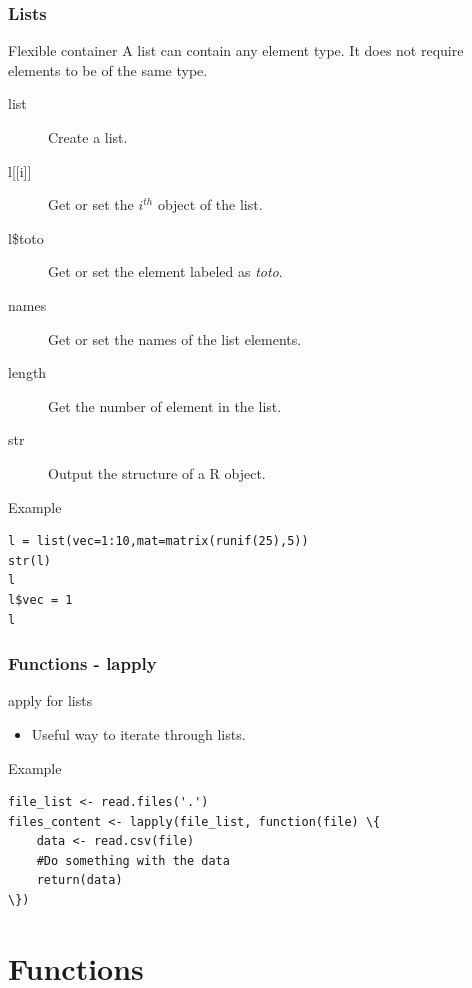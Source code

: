 \documentclass[10pt]{beamer}
\newenvironment{xframe}[2][]
  {\begin{frame}[fragile,environment=xframe,#1]
  \frametitle{#2}}
  {\end{frame}}
\begin{document}
\begin{xframe}{Lists}
  \begin{block}{Flexible container}
    A list can contain any element type. It does not require elements to be of
    the same type.
    \begin{description}
      \item[list] Create a list.
      \item[{l[[i]]} ] Get or set the $i^{th}$ object of the list.
      \item[l\$toto] Get or set the element labeled as {\it toto}.
      \item[names] Get or set the names of the list elements.
      \item[length] Get the number of element in the list.
      \item[str] Output the structure of a R object.
    \end{description}
  \end{block}
  \begin{exampleblock}{Example}
\begin{verbatim}
l = list(vec=1:10,mat=matrix(runif(25),5))
str(l)
l
l$vec = 1
l
\end{verbatim}
  \end{exampleblock}
\end{xframe}


\begin{xframe}{Functions - {\sf lapply}}
  \begin{block}{apply for lists}
    \begin{itemize}
    \item Useful way to iterate through lists.
    \end{itemize}
  \end{block}
  \begin{exampleblock}{Example}
\begin{verbatim}
file_list <- read.files('.')
files_content <- lapply(file_list, function(file) \{
	data <- read.csv(file)
	#Do something with the data
	return(data)
\})
\end{verbatim}  
  \end{exampleblock}
\end{xframe}


\section{Functions}
\end{document}
